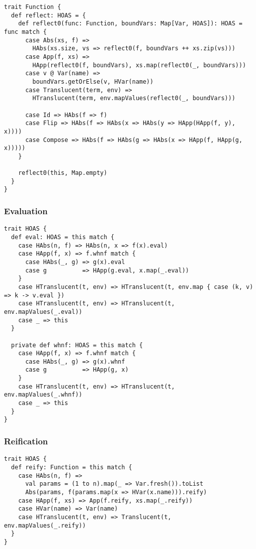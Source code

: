 \documentclass[../../../main.tex]{subfiles}
\begin{document}
\begin{verbatim}
trait Function {
  def reflect: HOAS = {
    def reflect0(func: Function, boundVars: Map[Var, HOAS]): HOAS = func match {
      case Abs(xs, f) =>
        HAbs(xs.size, vs => reflect0(f, boundVars ++ xs.zip(vs)))
      case App(f, xs) =>
        HApp(reflect0(f, boundVars), xs.map(reflect0(_, boundVars)))
      case v @ Var(name) =>
        boundVars.getOrElse(v, HVar(name))
      case Translucent(term, env) =>
        HTranslucent(term, env.mapValues(reflect0(_, boundVars)))

      case Id => HAbs(f => f)
      case Flip => HAbs(f => HAbs(x => HAbs(y => HApp(HApp(f, y), x))))
      case Compose => HAbs(f => HAbs(g => HAbs(x => HApp(f, HApp(g, x)))))
    }

    reflect0(this, Map.empty)
  }
}
\end{verbatim}

\subsubsection{Evaluation}
\begin{verbatim}
trait HOAS {
  def eval: HOAS = this match {
    case HAbs(n, f) => HAbs(n, x => f(x).eval)
    case HApp(f, x) => f.whnf match {
      case HAbs(_, g) => g(x).eval
      case g          => HApp(g.eval, x.map(_.eval))
    }
    case HTranslucent(t, env) => HTranslucent(t, env.map { case (k, v) => k -> v.eval })
    case HTranslucent(t, env) => HTranslucent(t, env.mapValues(_.eval))
    case _ => this
  }

  private def whnf: HOAS = this match {
    case HApp(f, x) => f.whnf match {
      case HAbs(_, g) => g(x).whnf
      case g          => HApp(g, x)
    }
    case HTranslucent(t, env) => HTranslucent(t, env.mapValues(_.whnf))
    case _ => this
  }
}
\end{verbatim}

\subsubsection{Reification}
\begin{verbatim}
trait HOAS {  
  def reify: Function = this match {
    case HAbs(n, f) =>
      val params = (1 to n).map(_ => Var.fresh()).toList
      Abs(params, f(params.map(x => HVar(x.name))).reify)
    case HApp(f, xs) => App(f.reify, xs.map(_.reify))
    case HVar(name) => Var(name)
    case HTranslucent(t, env) => Translucent(t, env.mapValues(_.reify))
  }
}
\end{verbatim}
\end{document}
